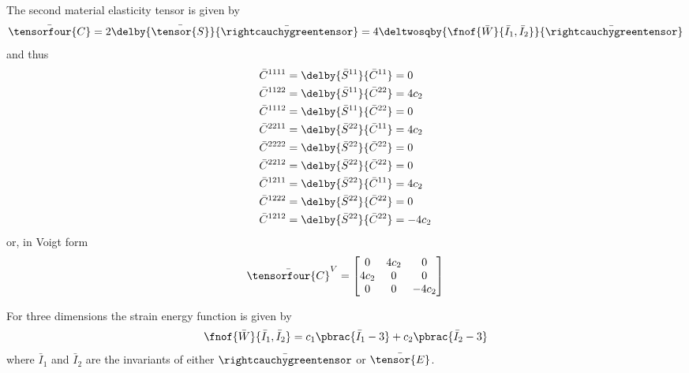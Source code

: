 The second material elasticity tensor is given by
\begin{equation}
  \bar{\tensorfour{C}}=2\delby{\bar{\tensor{S}}}{\bar{\rightcauchygreentensor}}=4\deltwosqby{\fnof{\bar{W}}{\bar{I}_{1},\bar{I}_{2}}}{\bar{\rightcauchygreentensor}}\\
\end{equation}
and thus
\begin{equation}
  \begin{split}
    \bar{C}^{1111}&=\delby{\bar{S}^{11}}{\bar{C}^{11}}=0\\
    \bar{C}^{1122}&=\delby{\bar{S}^{11}}{\bar{C}^{22}}=4c_{2}\\
    \bar{C}^{1112}&=\delby{\bar{S}^{11}}{\bar{C}^{22}}=0\\
    \bar{C}^{2211}&=\delby{\bar{S}^{22}}{\bar{C}^{11}}=4c_{2}\\
    \bar{C}^{2222}&=\delby{\bar{S}^{22}}{\bar{C}^{22}}=0\\
    \bar{C}^{2212}&=\delby{\bar{S}^{22}}{\bar{C}^{22}}=0\\
    \bar{C}^{1211}&=\delby{\bar{S}^{22}}{\bar{C}^{11}}=4c_{2}\\
    \bar{C}^{1222}&=\delby{\bar{S}^{22}}{\bar{C}^{22}}=0\\
    \bar{C}^{1212}&=\delby{\bar{S}^{22}}{\bar{C}^{22}}=-4c_{2}\\
  \end{split}
\end{equation}
or, in Voigt form
\begin{equation}
  \bar{\tensorfour{C}}^{V}=\begin{bmatrix}
  0 & 4c_{2} & 0 \\
  4c_{2} & 0 & 0 \\
  0 & 0 & -4c_{2}
  \end{bmatrix}
\end{equation}

For three dimensions the strain energy function is given by
\begin{equation}
  \fnof{\bar{W}}{\bar{I}_{1},\bar{I}_{2}}=c_{1}\pbrac{\bar{I}_{1}-3}+c_{2}\pbrac{\bar{I}_{2}-3}
\end{equation}
where $\bar{I}_{1}$ and $\bar{I}_{2}$ are the invariants of either $\bar{\rightcauchygreentensor}$ or $\bar{\tensor{E}}$.

